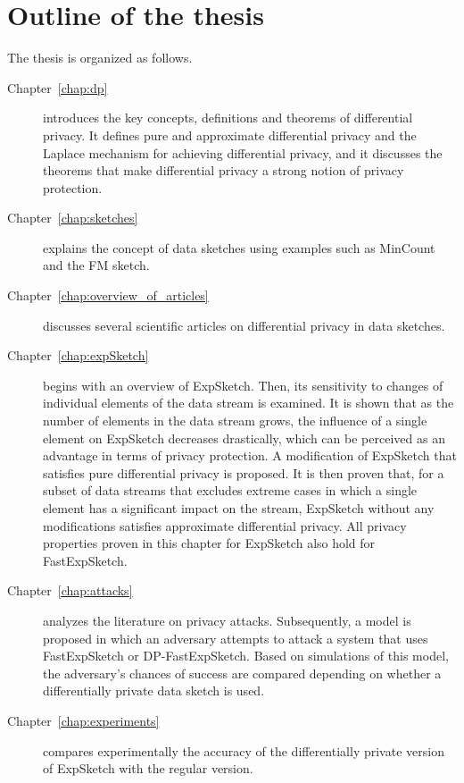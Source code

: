 \section*{Outline of the thesis}

The thesis is organized as follows.

\begin{description}
  \item[Chapter~\ref{chap:dp}] introduces the key concepts, definitions and theorems of differential privacy. It defines pure and approximate differential privacy and the Laplace mechanism for achieving differential privacy, and it discusses the theorems that make differential privacy a strong notion of privacy protection.
  \item[Chapter~\ref{chap:sketches}] explains the concept of data sketches using examples such as MinCount and the FM sketch.
  \item[Chapter~\ref{chap:overview_of_articles}] discusses several scientific articles on differential privacy in data sketches.
  \item[Chapter~\ref{chap:expSketch}] begins with an overview of ExpSketch. Then, its sensitivity to changes of individual elements of the data stream is examined. It is shown that as the number of elements in the data stream grows, the influence of a single element on ExpSketch decreases drastically, which can be perceived as an advantage in terms of privacy protection. A modification of ExpSketch that satisfies pure differential privacy is proposed. It is then proven that, for a subset of data streams that excludes extreme cases in which a single element has a significant impact on the stream, ExpSketch without any modifications satisfies approximate differential privacy. All privacy properties proven in this chapter for ExpSketch also hold for FastExpSketch.
  \item[Chapter~\ref{chap:attacks}] analyzes the literature on privacy attacks. Subsequently, a model is proposed in which an adversary attempts to attack a system that uses FastExpSketch or DP-FastExpSketch. Based on simulations of this model, the adversary's chances of success are compared depending on whether a differentially private data sketch is used.
  \item[Chapter~\ref{chap:experiments}] compares experimentally the accuracy of the differentially private version of ExpSketch with the regular version.
\end{description}
